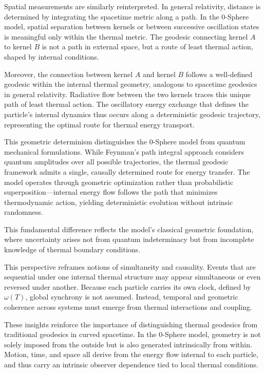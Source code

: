 \documentclass[%
 reprint,
 amsmath,amssymb,
 aps,
]{revtex4-1}
\numberwithin{equation}{section}%
\begin{document}
Spatial measurements are similarly reinterpreted. In general relativity, distance is determined by integrating the spacetime metric along a path. In the 0-Sphere model, spatial separation between kernels or between successive oscillation states is meaningful only within the thermal metric. The geodesic connecting kernel $A$ to kernel $B$ is not a path in external space, but a route of least thermal action, shaped by internal conditions.

Moreover, the connection between kernel $A$ and kernel $B$ follows a well-defined geodesic within the internal thermal geometry, analogous to spacetime geodesics in general relativity. Radiative flow between the two kernels traces this unique path of least thermal action. The oscillatory energy exchange that defines the particle's internal dynamics thus occurs along a deterministic geodesic trajectory, representing the optimal route for thermal energy transport.

This geometric determinism distinguishes the 0-Sphere model from quantum mechanical formulations. While Feynman's path integral approach considers quantum amplitudes over all possible trajectories, the thermal geodesic framework admits a single, causally determined route for energy transfer. The model operates through geometric optimization rather than probabilistic superposition—internal energy flow follows the path that minimizes thermodynamic action, yielding deterministic evolution without intrinsic randomness.

This fundamental difference reflects the model's classical geometric foundation, where uncertainty arises not from quantum indeterminacy but from incomplete knowledge of thermal boundary conditions.

This perspective reframes notions of simultaneity and causality. Events that are sequential under one internal thermal structure may appear simultaneous or even reversed under another. Because each particle carries its own clock, defined by $\omega(T)$, global synchrony is not assumed. Instead, temporal and geometric coherence across systems must emerge from thermal interactions and coupling.

These insights reinforce the importance of distinguishing thermal geodesics from traditional geodesics in curved spacetime. In the 0-Sphere model, geometry is not solely imposed from the outside but is also generated intrinsically from within. Motion, time, and space all derive from the energy flow internal to each particle, and thus carry an intrinsic observer dependence tied to local thermal conditions.
\end{document}
